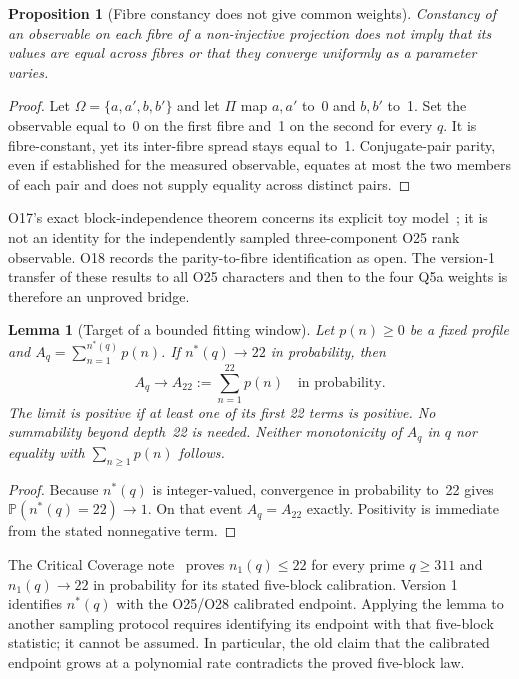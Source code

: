 \documentclass[12pt]{article}
\newtheorem{lemma}[theorem]{Lemma}
\newtheorem{proposition}[theorem]{Proposition}
\theoremstyle{definition}
\theoremstyle{remark}
\begin{document}
  \begin{proposition}[Fibre constancy does not give common weights]
    \label{prop:fibre}
    Constancy of an observable on each fibre of a non-injective
    projection does not imply that its values are equal across fibres
    or that they converge uniformly as a parameter varies.
  \end{proposition}

  \begin{proof}
    Let $\Omega=\{a,a',b,b'\}$ and let $\Pi$ map $a,a'$ to~0 and
    $b,b'$ to~1.
    Set the observable equal to~0 on the first fibre and~1 on the
    second for every $q$.
    It is fibre-constant, yet its inter-fibre spread stays equal to~1.
    Conjugate-pair parity, even if established for the measured
    observable, equates at most the two members of each pair and
    does not supply equality across distinct pairs.
  \end{proof}

  O17's exact block-independence theorem concerns its explicit toy
  model~\cite{Beau2026a21}; it is not an identity for the independently
  sampled three-component O25 rank observable.
  O18 records the parity-to-fibre identification as open.
  The version-1 transfer of these results to all O25 characters and
  then to the four Q5a weights is therefore an unproved bridge.

  \begin{lemma}[Target of a bounded fitting window]
    \label{lem:Aq}
    Let $p(n)\ge0$ be a fixed profile and
    $A_q=\sum_{n=1}^{n^*(q)}p(n)$.
    If $n^*(q)\to22$ in probability, then
    \begin{equation}
      \label{eq:Aq-limit}
      A_q\longrightarrow A_{22}:=\sum_{n=1}^{22}p(n)
      \quad\text{in probability}.
    \end{equation}
    The limit is positive if at least one of its first 22 terms is
    positive.
    No summability beyond depth~22 is needed.
    Neither monotonicity of $A_q$ in $q$ nor equality with
    $\sum_{n\ge1}p(n)$ follows.
  \end{lemma}

  \begin{proof}
    Because $n^*(q)$ is integer-valued, convergence in probability
    to~22 gives $\mathbb P(n^*(q)=22)\to1$.
    On that event $A_q=A_{22}$ exactly.
    Positivity is immediate from the stated nonnegative term.
  \end{proof}

  The Critical Coverage note~\cite{Beau2026ccnote} proves
  $n_1(q)\le22$ for every prime $q\ge311$ and $n_1(q)\to22$ in
  probability for its stated five-block calibration.
  Version 1 identifies $n^*(q)$ with the O25/O28 calibrated endpoint.
  Applying the lemma to another sampling protocol requires identifying
  its endpoint with that five-block statistic; it cannot be assumed.
  In particular, the old claim that the calibrated endpoint grows at a
  polynomial rate contradicts the proved five-block law.
\end{document}
